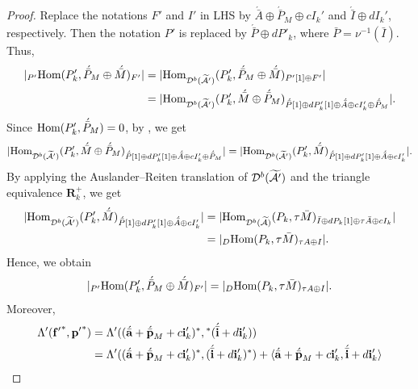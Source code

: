 \documentclass[reqno,12pt]{amsart}
\numberwithin{equation}{section}
\def\lr#1{\langle #1\rangle} \def\fin{\hfill$\square$}  \def\lra{\longrightarrow} \def\mod{\mbox{\rm \textbf{mod}}\,}\def\Mod{\mbox{\rm mod}\,}\def\top{\mbox{\rm top}\,}\def\soc{\mbox{\rm soc}\,}
\theoremstyle{plain} %
\theoremstyle{definition} %
\begin{document}
\begin{proof}
Replace the notations $F'$ and $I'$ in LHS by $\acute{\bar{A}}\oplus \acute{\bar{P}}_M\oplus cI_k'$ and $\acute{\bar{I}}\oplus dI_k'$, respectively.
Then the notation $P'$ is replaced by $\acute{\bar{P}}\oplus dP'_k$, where $\bar{P}=\nu^{-1}(\bar{I})$. Thus,
\begin{align*}|_{P'}\mbox{\rm Hom}(P'_k,\acute{\bar{P}}_M\oplus \acute{\bar{M}})_{F'}|&=|\mbox{\rm Hom}_{\mathcal{D}^b(\widetilde{\mathcal{A}'})}(P'_k,\acute{\bar{P}}_M\oplus \acute{\bar{M}})_{P'[1]\oplus F'}|\\
&=|\mbox{\rm Hom}_{\mathcal{D}^b(\widetilde{\mathcal{A}'})}(P'_k,\acute{\bar{M}}\oplus\acute{\bar{P}}_M)_{\acute{\bar{P}}[1]\oplus dP'_k[1]\oplus\acute{\bar{A}}\oplus cI_k'\oplus \acute{\bar{P}}_M}|.\end{align*}
Since $\mbox{\rm Hom}(P'_k,\acute{\bar{P}}_M)=0$, by \cite[Lemma 2.5]{PX}, we get
\begin{align*}|\mbox{\rm Hom}_{\mathcal{D}^b(\widetilde{\mathcal{A}'})}(P'_k,\acute{\bar{M}}\oplus\acute{\bar{P}}_M)_{\acute{\bar{P}}[1]\oplus dP'_k[1]\oplus\acute{\bar{A}}\oplus cI_k'\oplus \acute{\bar{P}}_M}|=|\mbox{\rm Hom}_{\mathcal{D}^b(\widetilde{\mathcal{A}'})}(P'_k,\acute{\bar{M}})_{\acute{\bar{P}}[1]\oplus dP'_k[1]\oplus\acute{\bar{A}}\oplus cI_k'}|.\end{align*}
By applying the Auslander--Reiten translation of $\mathcal{D}^b(\widetilde{{\mathcal{A}'}})$ and the triangle equivalence $\mathbf{R}_k^+$, we get
\begin{align*}|\mbox{\rm Hom}_{\mathcal{D}^b(\widetilde{\mathcal{A}'})}(P'_k,\acute{\bar{M}})_{\acute{\bar{P}}[1]\oplus dP'_k[1]\oplus\acute{\bar{A}}\oplus cI_k'}|&=|\mbox{\rm Hom}_{\mathcal{D}^b(\widetilde{\mathcal{A}})}(P_k,\tau\bar{M})_{\bar{I}\oplus dP_k[1]\oplus\tau{\bar{A}}\oplus cI_k}|\\
&=|_D\mbox{\rm Hom}(P_k,\tau \bar{M})_{\tau A\oplus I}|.\end{align*}
Hence, we obtain \begin{align*}|_{P'}\mbox{\rm Hom}(P'_k,\acute{\bar{P}}_M\oplus \acute{\bar{M}})_{F'}|=|_D\mbox{\rm Hom}(P_k,\tau \bar{M})_{\tau A\oplus I}|.\end{align*}
Moreover, \begin{align*}\Lambda'({{\bf f}'}^\ast,{{\bf p}'}^\ast)&=\Lambda'(({\acute{\bar{{\bf a}}}}+{\acute{\bar{{\bf p}}}}_M+c{{\bf i}_k'})^\ast,{^\ast}({\acute{\bar{{\bf i}}}}+d{{\bf i}_k'}))\\
&=\Lambda'(({\acute{\bar{{\bf a}}}}+{\acute{\bar{{\bf p}}}}_M+c{{\bf i}_k'})^\ast,({\acute{\bar{{\bf i}}}}+d{{\bf i}_k'})^\ast)+\lr{{\acute{\bar{{\bf a}}}}+{\acute{\bar{{\bf p}}}}_M+c{{\bf i}_k'},{\acute{\bar{{\bf i}}}}+d{{\bf i}_k'}}\\

\end{align*}
\end{proof}
\end{document}
